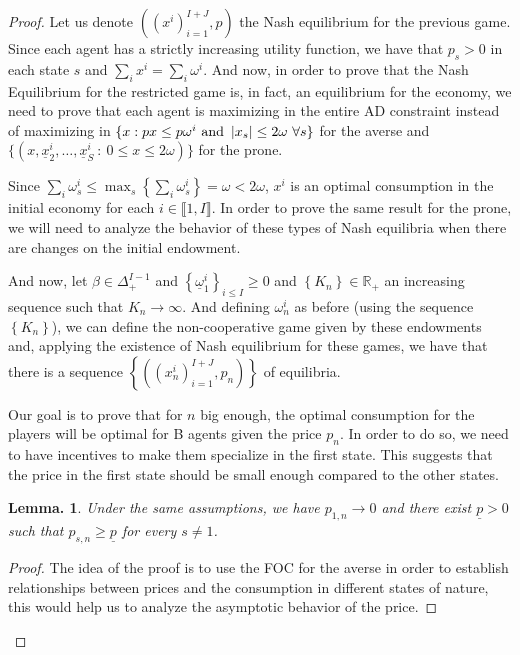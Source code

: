\documentclass[pdftex]{article}
\numberwithin{equation}{section}
\theoremstyle{th}
\newtheorem{lemma}{{Lemma}.}%
\newtheorem{proof lemma}{{Proof Lemma}.}
\theoremstyle{definition}
\newtheorem*{risk lovers}{Risk lovers}
\newtheorem*{risk averse}{Risk averse}
\begin{document}
{\begin{proof}
Let us denote $\left(\left(x^i\right)_{i=1}^{I+J},p\right)$ the Nash equilibrium for the previous game. %
Since each agent has a strictly increasing utility function, we have that $p_s>0$ in each state $s$ and $\sum_ix^i=\sum_i\omega^i$.
And now, in order to prove that the Nash Equilibrium for the restricted game is, in fact, an equilibrium for the economy, we need to prove that each agent is maximizing in the entire AD constraint instead of maximizing in $\{x:px\leq{p}\omega^i\textnormal{ and }\left|x_s\right|\leq2\omega\ \forall{s}\}$ for the averse and $\{(x,\underline{x}_2^i,\dots,\underline{x}_S^i\ :\ 0\leq{x}\leq2\omega)\}$ for the prone.

Since $\sum_i\omega^i_s\leq\max_s\left\{\sum_i\omega_s^i\right\}=\omega<2\omega$, $x^i$ is an optimal consumption in the initial economy for each $i\in\llbracket1,I\rrbracket$. In order to prove the same result for the prone, we will need to analyze the behavior of these types of Nash equilibria when there are changes on the initial endowment.

And now, let $\beta\in\Delta_+^{I-1}$ and $\left\{\underline{\omega}_1^i\right\}_{i\leq{I}}\geq0$ and $\left\{K_n\right\}\in\mathbb{R}_+$ an increasing sequence such that $K_n\rightarrow\infty$. And defining $\omega^i_n$ as before (using the sequence $\left\{K_n\right\}$), we can define the non-cooperative game given by these endowments and, applying the existence of Nash equilibrium for these games, we have that there is a sequence $\left\{\left(\left(x^i_n\right)_{i=1}^{I+J},p_n\right)\right\}$ of equilibria.

Our goal is to prove that for $n$ big enough, the optimal consumption for the players will be optimal for B agents given the price $p_n$. In order to do so, we need to have incentives to make them specialize in the first state. This suggests that the price in the first state should be small enough compared to the other states.
\begin{lemma}
\label{lemma1}
Under the same assumptions, we have $p_{1,n}\rightarrow0$ and there exist $\underline{p}>0$ such that $p_{s,n}\geq\underline{p}$ for every $s\neq1$.
\end{lemma}
\begin{proof}%
The idea of the proof is to use the FOC for the averse in order to establish relationships between prices and the consumption in different states of nature, this would help us to analyze the asymptotic behavior of the price.


\end{proof}
\end{proof}}
\end{document}
